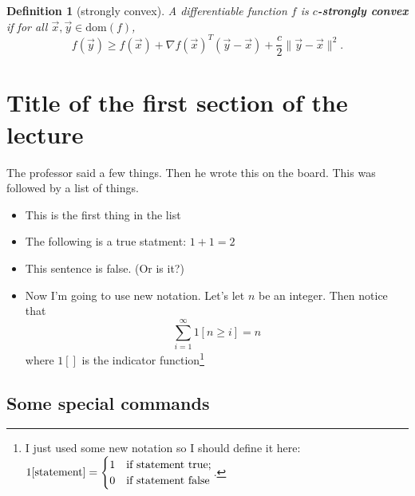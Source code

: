 \documentclass{article}
\newtheorem{definition}[theorem]{Definition}
\newcommand{\dom}{\mathrm{dom}}
\begin{document}
\begin{definition}[strongly convex]
A differentiable function $f$ is \textbf{$c$-strongly convex} if for all $\vec{x},\vec{y} \in \dom(f)$, 
\[f(\vec{y}) \ge f(\vec{x}) + \nabla f(\vec{x})^T (\vec{y} - \vec{x}) + \frac{c}{2} \|\vec{y} - \vec{x}\|^2.\]
\end{definition}
\section{Title of the first section of the lecture} 

The professor said a few things. Then he wrote this on the board. This was followed by a list of things.
\begin{itemize}
\item This is the first thing in the list
\item The following is a true statment: $1 + 1 = 2$
\item This sentence is false. (Or is it?)
\item Now I'm going to use new notation. Let's let $n$ be an integer. Then notice that
\[
  \sum_{i=1}^\infty 1[n \geq i] = n
\]
where $1[]$ is the indicator function\footnote{I just used some new notation so I should define it here:
$
1[\textnormal{statement}] = \begin{cases}

  1 & \mbox{if statement true;} \\

  0 & \mbox{if statement false} 
  \end{cases}
  $.}
\end{itemize}

\subsection{Some special commands}
\end{document}
